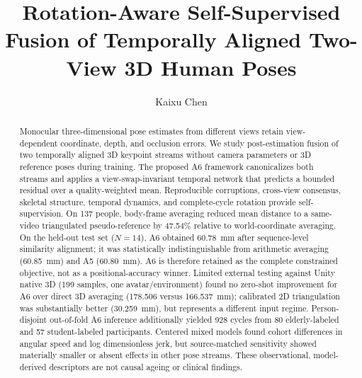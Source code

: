 \documentclass[a4paper,fleqn]{cas-sc}
\begin{document}
\let\WriteBookmarks\relax
\def\floatpagepagefraction{1}
\def\textpagefraction{.001}


\title[mode=title]{Rotation-Aware Self-Supervised Fusion of Temporally Aligned Two-View 3D Human Poses}

\author[1]{Kaixu Chen}
\cormark[1]

\begin{abstract}
Monocular three-dimensional pose estimates from different views retain
view-dependent coordinate, depth, and occlusion errors. We study
post-estimation fusion of two temporally aligned 3D keypoint streams without
camera parameters or 3D reference poses during training. The proposed A6
framework canonicalizes both streams and applies a view-swap-invariant temporal
network that predicts a bounded residual over a quality-weighted mean.
Reproducible corruptions, cross-view consensus, skeletal structure, temporal
dynamics, and complete-cycle rotation provide self-supervision. On 137 people,
body-frame averaging reduced mean distance to a same-video triangulated
pseudo-reference by 47.54\% relative to world-coordinate averaging. On the
held-out test set ($N=14$), A6 obtained 60.78~mm after sequence-level
similarity alignment; it was statistically indistinguishable from arithmetic
averaging (60.85~mm) and A5 (60.80~mm). A6 is therefore retained as the complete
constrained objective, not as a positional-accuracy winner. Limited external
testing against Unity native 3D (199 samples, one avatar/environment) found no
zero-shot improvement for A6 over direct 3D averaging (178.506 versus
166.537~mm); calibrated 2D triangulation was substantially better
(30.259~mm), but represents a different input regime. Person-disjoint
out-of-fold A6 inference additionally yielded 928 cycles from 80
elderly-labeled and 57 student-labeled participants. Centered mixed models found
cohort differences in angular speed and log dimensionless jerk, but
source-matched sensitivity showed materially smaller or absent effects in other
pose streams. These observational, model-derived descriptors are not causal
ageing or clinical findings.
\end{abstract}
\end{document}
